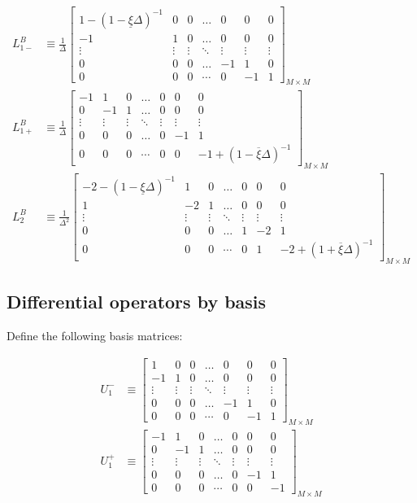 \documentclass[11pt]{article}
\theoremstyle{definition}
\begin{document}
\begin{align}
L_{1-}^B &\equiv \frac{1}{\Delta}\begin{bmatrix}
1 - (1 - \underline{\xi} \Delta)^{-1} &0&0&\dots&0&0&0\\
-1&1&0&\dots&0&0&0\\
\vdots&\vdots&\vdots&\ddots&\vdots&\vdots&\vdots\\
0&0&0&\dots&-1&1&0\\
0&0&0&\cdots&0&-1&1
\end{bmatrix}_{M\times M} \\
L_{1+}^B &\equiv \frac{1}{\Delta}\begin{bmatrix}
-1&1&0&\dots&0&0&0\\
0&-1&1&\dots&0&0&0\\
\vdots&\vdots&\vdots&\ddots&\vdots&\vdots&\vdots\\
0&0&0&\dots&0&-1&1\\
0&0&0&\cdots&0&0&-1+(1-\overline{\xi} \Delta)^{-1}
\end{bmatrix}_{M\times M} \\
L_2^B &\equiv \frac{1}{\Delta^2}\begin{bmatrix}
-2 - (1 - \underline{\xi}\Delta)^{-1} &1&0&\dots&0&0&0\\
1&-2&1&\dots&0&0&0\\
\vdots&\vdots&\vdots&\ddots&\vdots&\vdots&\vdots\\
0&0&0&\dots&1&-2&1\\
0&0&0&\cdots&0&1&-2 + (1 + \overline{\xi}\Delta)^{-1}
\end{bmatrix}_{M\times M}
\end{align}


\iffalse
\subsection{Differential operators by basis}
Define the following basis matrices:

\begin{align}
U_1^{-} &\equiv \begin{bmatrix}
1  &0&0&\dots&0&0&0\\
-1&1&0&\dots&0&0&0\\
\vdots&\vdots&\vdots&\ddots&\vdots&\vdots&\vdots\\
0&0&0&\dots&-1&1&0\\
0&0&0&\cdots&0&-1&1
\end{bmatrix}_{M\times M}\label{eq:L-1-basis} \\
U_1^{+} &\equiv \begin{bmatrix}
-1  &1&0&\dots&0&0&0\\
0&-1&1&\dots&0&0&0\\
\vdots&\vdots&\vdots&\ddots&\vdots&\vdots&\vdots\\
0&0&0&\dots&0&-1&1\\
0&0&0&\cdots&0&0&-1
\end{bmatrix}_{M\times M}\label{eq:L-1+-basis} \\
\end{align}
\end{document}
